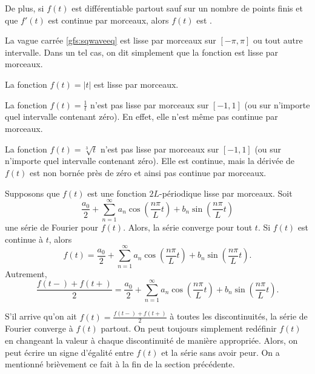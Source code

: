 De plus, si $f(t)$ est différentiable partout sauf sur un nombre de points finis et que $f'(t)$ est continue par morceaux, alors
$f(t)$ est \emph{}.

\begin{example}
La vague carrée \eqref{gfs:sqwaveeq}
est lisse par morceaux sur  $[-\pi,\pi]$ ou tout autre intervalle. Dans un tel cas, on dit simplement que la fonction est lisse par morceaux.  
\end{example}

\begin{example}
La fonction $f(t) = \lvert t \lvert$
est lisse par morceaux.
\end{example}

\begin{example}
La fonction $f(t) = \frac{1}{t}$ n'est pas lisse par morceaux sur 
$[-1,1]$ (ou sur n'importe quel intervalle contenant zéro). En effet, elle n'est même pas continue par morceaux. 
\end{example}

\begin{example}
La fonction $f(t) = \sqrt[3]{t}$ n'est pas lisse par morceaux sur 
$[-1,1]$ (ou sur n'importe quel intervalle contenant zéro).  Elle est continue, mais la dérivée de $f(t)$ est non bornée près de zéro et ainsi pas continue par morceaux. 
\end{example}

\begin{theorem}
Supposons que  $f(t)$ est une fonction $2L$-périodique lisse par morceaux.
Soit
\begin{equation*}
\frac{a_0}{2} + \sum_{n=1}^\infty a_n \cos \left( \frac{n \pi}{L} t
\right)
+ b_n \sin \left( \frac{n \pi}{L} t \right)
\end{equation*}
une série de Fourier pour $f(t)$.  Alors, la série converge pour tout $t$.  Si $f(t)$ est continue à $t$,  alors
\begin{equation*}
f(t) = \frac{a_0}{2} + \sum_{n=1}^\infty
a_n \cos \left( \frac{n \pi}{L} t \right)
+ b_n \sin \left( \frac{n \pi}{L} t \right) .
\end{equation*}
Autrement,
\begin{equation*}
\frac{f(t-)+f(t+)}{2} =
\frac{a_0}{2} + \sum_{n=1}^\infty a_n \cos \left( \frac{n \pi}{L}  t
\right)
+ b_n \sin \left( \frac{n \pi}{L} t \right) .
\end{equation*}
\end{theorem}

S'il arrive qu'on ait
$f(t) = \frac{f(t-)+f(t+)}{2}$ à toutes les discontinuités, la série de Fourier converge à  $f(t)$ partout. On peut toujours simplement redéfinir $f(t)$ en changeant la valeur à chaque discontinuité de manière appropriée. Alors, on peut écrire un  signe d'égalité entre $f(t)$ et la série sans avoir peur. On a mentionné  brièvement ce fait à la fin de la section précédente. 

